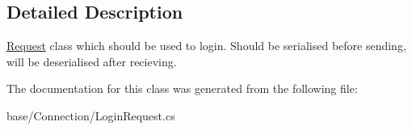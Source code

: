 \subsection{Detailed Description}
\hyperlink{classCore_1_1Connections_1_1Request}{Request} class which should be used to login. Should be serialised before sending, will be deserialised after recieving. 



The documentation for this class was generated from the following file\-:\begin{DoxyCompactItemize}
\item 
base/\-Connection/Login\-Request.\-cs\end{DoxyCompactItemize}
